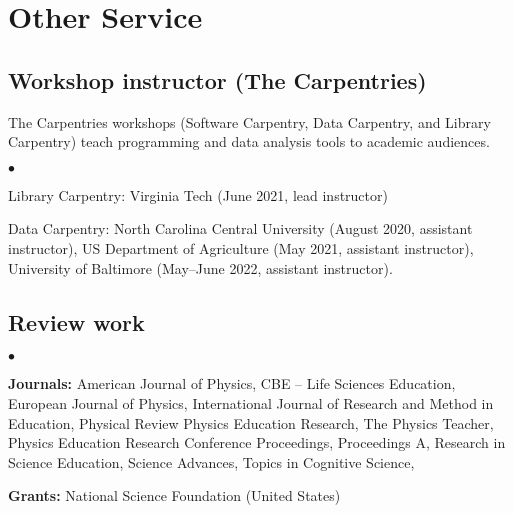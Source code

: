 \documentclass[a4paper,10pt]{article}
\newcommand{\squishlist}{
	\begin{list}{$\bullet$}
		{ \setlength{\itemsep}{0pt}
			\setlength{\parsep}{3pt}
			\setlength{\topsep}{3pt}
			\setlength{\partopsep}{0pt}
			\setlength{\labelwidth}{1em}
			\setlength{\labelsep}{0.5em} } }
\newcommand{\squishend}{
\end{list}  }
\begin{document}

\section*{Other Service}

\subsection*{Workshop instructor (The Carpentries)}

The Carpentries workshops (Software Carpentry, Data Carpentry, and Library Carpentry) teach programming and data analysis tools to academic audiences. 

\squishlist
\item Library Carpentry: Virginia Tech (June 2021, lead instructor)
\item Data Carpentry: North Carolina Central University (August 2020, assistant instructor),  US Department of Agriculture (May 2021, assistant instructor), University of Baltimore (May--June 2022, assistant instructor).
\squishend


\subsection*{Review work}

\squishlist
\item \textbf{Journals:} American Journal of Physics, CBE – Life Sciences Education, European Journal of Physics, International Journal of Research and Method in Education, Physical Review Physics Education Research, The Physics Teacher, Physics Education Research Conference Proceedings, Proceedings A, Research in Science Education, Science Advances, Topics in Cognitive Science, 
\item \textbf{Grants:} National Science Foundation (United States)
\squishend

 
\end{document}
